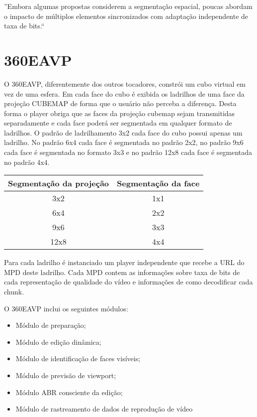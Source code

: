 ''Embora algumas propostas considerem a segmentação espacial, poucas abordam o impacto de múltiplos elementos sincronizados com adaptação independente de taxa de bits.``


\section{360EAVP}

O 360EAVP, diferentemente dos outros tocadores, constrói um cubo virtual em vez de uma esfera. Em cada face do cubo é exibida os ladrilhos de uma face da projeção CUBEMAP de forma que o usuário não perceba a diferença. Desta forma o player obriga que as faces da projeção cubemap sejam transmitidas separadamente e cada face poderá ser segmentada em qualquer formato de ladrilhos. O padrão de ladrilhamento 3x2 cada face do cubo possui apenas um ladrilho. No padrão 6x4 cada face é segmentada no padrão 2x2, no padrão 9x6 cada face é segmentada no formato 3x3 e no padrão 12x8 cada face é segmentada no padrão 4x4.

\begin{tabular}{|c|c|}
	\hline
	Segmentação
	da projeção
	& Segmentação
	da face
	\\
	\hline
	3x2 & 1x1 \\
	\hline
	6x4 & 2x2 \\
	\hline
	9x6 & 3x3 \\
	\hline
	12x8 & 4x4 \\
	\hline
\end{tabular}

Para cada ladrilho é instanciado um player independente que recebe a URL do MPD deste ladrilho. Cada MPD contem as informações sobre taxa de bits de cada representação de qualidade do vídeo e informações de como decodificar cada chunk.

O 360EAVP inclui os seguintes módulos:

\begin{itemize}
	\item Módulo de preparação;
	\item Módulo de edição dinâmica;
	\item Módulo de identificação de faces visíveis;
	\item Módulo de previsão de viewport;
	\item Módulo ABR consciente da edição;
	\item Módulo de rastreamento de dados de reprodução de vídeo
\end{itemize}

